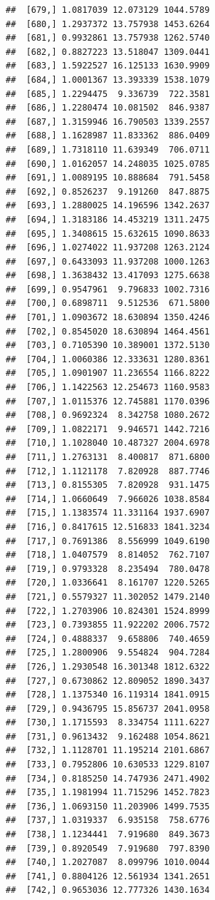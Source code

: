 \documentclass[article]{jss}\usepackage[]{graphicx}\usepackage[]{xcolor}
\makeatletter
\newenvironment{kframe}{%
 \def\at@end@of@kframe{}%
 \ifinner\ifhmode%
  \def\at@end@of@kframe{\end{minipage}}%
  \begin{minipage}{\columnwidth}%
 \fi\fi%
 \def\FrameCommand##1{\hskip\@totalleftmargin \hskip-\fboxsep
 \colorbox{shadecolor}{##1}\hskip-\fboxsep
     \hskip-\linewidth \hskip-\@totalleftmargin \hskip\columnwidth}%
 \MakeFramed {\advance\hsize-\width
   \@totalleftmargin\z@ \linewidth\hsize
   \@setminipage}}%
 {\par\unskip\endMakeFramed%
 \at@end@of@kframe}
\newenvironment{knitrout}{}{} %
\makeatother
\begin{document}
\begin{knitrout}
\begin{kframe}
\begin{verbatim}
##  [679,] 1.0817039 12.073129 1044.5789
##  [680,] 1.2937372 13.757938 1453.6264
##  [681,] 0.9932861 13.757938 1262.5740
##  [682,] 0.8827223 13.518047 1309.0441
##  [683,] 1.5922527 16.125133 1630.9909
##  [684,] 1.0001367 13.393339 1538.1079
##  [685,] 1.2294475  9.336739  722.3581
##  [686,] 1.2280474 10.081502  846.9387
##  [687,] 1.3159946 16.790503 1339.2557
##  [688,] 1.1628987 11.833362  886.0409
##  [689,] 1.7318110 11.639349  706.0711
##  [690,] 1.0162057 14.248035 1025.0785
##  [691,] 1.0089195 10.888684  791.5458
##  [692,] 0.8526237  9.191260  847.8875
##  [693,] 1.2880025 14.196596 1342.2637
##  [694,] 1.3183186 14.453219 1311.2475
##  [695,] 1.3408615 15.632615 1090.8633
##  [696,] 1.0274022 11.937208 1263.2124
##  [697,] 0.6433093 11.937208 1000.1263
##  [698,] 1.3638432 13.417093 1275.6638
##  [699,] 0.9547961  9.796833 1002.7316
##  [700,] 0.6898711  9.512536  671.5800
##  [701,] 1.0903672 18.630894 1350.4246
##  [702,] 0.8545020 18.630894 1464.4561
##  [703,] 0.7105390 10.389001 1372.5130
##  [704,] 1.0060386 12.333631 1280.8361
##  [705,] 1.0901907 11.236554 1166.8222
##  [706,] 1.1422563 12.254673 1160.9583
##  [707,] 1.0115376 12.745881 1170.0396
##  [708,] 0.9692324  8.342758 1080.2672
##  [709,] 1.0822171  9.946571 1442.7216
##  [710,] 1.1028040 10.487327 2004.6978
##  [711,] 1.2763131  8.400817  871.6800
##  [712,] 1.1121178  7.820928  887.7746
##  [713,] 0.8155305  7.820928  931.1475
##  [714,] 1.0660649  7.966026 1038.8584
##  [715,] 1.1383574 11.331164 1937.6907
##  [716,] 0.8417615 12.516833 1841.3234
##  [717,] 0.7691386  8.556999 1049.6190
##  [718,] 1.0407579  8.814052  762.7107
##  [719,] 0.9793328  8.235494  780.0478
##  [720,] 1.0336641  8.161707 1220.5265
##  [721,] 0.5579327 11.302052 1479.2140
##  [722,] 1.2703906 10.824301 1524.8999
##  [723,] 0.7393855 11.922202 2006.7572
##  [724,] 0.4888337  9.658806  740.4659
##  [725,] 1.2800906  9.554824  904.7284
##  [726,] 1.2930548 16.301348 1812.6322
##  [727,] 0.6730862 12.809052 1890.3437
##  [728,] 1.1375340 16.119314 1841.0915
##  [729,] 0.9436795 15.856737 2041.0958
##  [730,] 1.1715593  8.334754 1111.6227
##  [731,] 0.9613432  9.162488 1054.8621
##  [732,] 1.1128701 11.195214 2101.6867
##  [733,] 0.7952806 10.630533 1229.8107
##  [734,] 0.8185250 14.747936 2471.4902
##  [735,] 1.1981994 11.715296 1452.7823
##  [736,] 1.0693150 11.203906 1499.7535
##  [737,] 1.0319337  6.935158  758.6776
##  [738,] 1.1234441  7.919680  849.3673
##  [739,] 0.8920549  7.919680  797.8390
##  [740,] 1.2027087  8.099796 1010.0044
##  [741,] 0.8804126 12.561934 1341.2651
##  [742,] 0.9653036 12.777326 1430.1634

\end{verbatim}
\end{kframe}
\end{knitrout}
\end{document}
